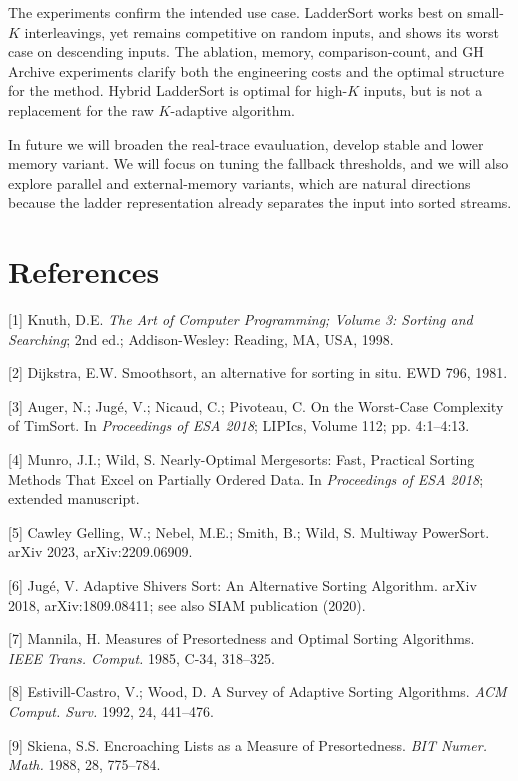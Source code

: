 \documentclass[10pt]{article}
\begin{document}
The experiments confirm the intended use case. LadderSort works best on small-\(K\) interleavings, yet remains competitive on random inputs, and shows its worst case on descending inputs. The ablation, memory, comparison-count, and GH Archive experiments clarify both the engineering costs and the optimal structure for the method. Hybrid LadderSort is optimal for high-\(K\) inputs, but is not a replacement for the raw \(K\)-adaptive algorithm.

In future we will broaden the real-trace evauluation, develop stable and lower memory variant. We will focus on tuning the fallback thresholds, and we will also explore parallel and external-memory variants, which are natural directions because the ladder representation already separates the input into sorted streams.

\section{References}\label{references}

{[}1{]} Knuth, D.E. \emph{The Art of Computer Programming; Volume 3: Sorting and Searching}; 2nd ed.; Addison-Wesley: Reading, MA, USA, 1998.

{[}2{]} Dijkstra, E.W. Smoothsort, an alternative for sorting in situ. EWD 796, 1981.

{[}3{]} Auger, N.; Jugé, V.; Nicaud, C.; Pivoteau, C. On the Worst-Case Complexity of TimSort. In \emph{Proceedings of ESA 2018}; LIPIcs, Volume 112; pp. 4:1--4:13.

{[}4{]} Munro, J.I.; Wild, S. Nearly-Optimal Mergesorts: Fast, Practical Sorting Methods That Excel on Partially Ordered Data. In \emph{Proceedings of ESA 2018}; extended manuscript.

{[}5{]} Cawley Gelling, W.; Nebel, M.E.; Smith, B.; Wild, S. Multiway PowerSort. arXiv 2023, arXiv:2209.06909.

{[}6{]} Jugé, V. Adaptive Shivers Sort: An Alternative Sorting Algorithm. arXiv 2018, arXiv:1809.08411; see also SIAM publication (2020).

{[}7{]} Mannila, H. Measures of Presortedness and Optimal Sorting Algorithms. \emph{IEEE Trans. Comput.} 1985, C-34, 318--325.

{[}8{]} Estivill-Castro, V.; Wood, D. A Survey of Adaptive Sorting Algorithms. \emph{ACM Comput. Surv.} 1992, 24, 441--476.

{[}9{]} Skiena, S.S. Encroaching Lists as a Measure of Presortedness. \emph{BIT Numer. Math.} 1988, 28, 775--784.
\end{document}
